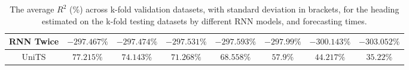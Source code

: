 \begin{table}[!ht]
{\begin{tabular}{|c|c|c|c|c|c|c|c|}
			RNN Twice & $-297.467\%$ & $-297.474\%$ & $-297.531\%$ & $-297.593\%$ & $-297.99\%$ & $-300.143\%$ & $-303.052\%$ \\ \hline
			UniTS & $77.215\%$ & $74.143\%$ & $71.268\%$ & $\mathbf{68.558\%}$ & $\mathbf{57.9\%}$ & $\mathbf{44.217\%}$ & $\mathbf{35.22\%}$ \\ \hline
		\end{tabular}
	}
	\caption{The average $R^{2}$ (\%) across k-fold validation datasets, with standard deviation in brackets, for the heading estimated on the k-fold testing datasets by different RNN models, and forecasting times.}
	\label{tab:all_direction_R2}
\end{table}